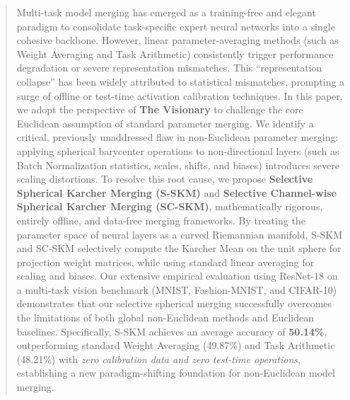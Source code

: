 \documentclass{article}
\begin{document}

\printAffiliationsAndNotice{}

\begin{abstract}
Multi-task model merging has emerged as a training-free and elegant paradigm to consolidate task-specific expert neural networks into a single cohesive backbone. However, linear parameter-averaging methods (such as Weight Averaging and Task Arithmetic) consistently trigger performance degradation or severe representation mismatches. This ``representation collapse'' has been widely attributed to statistical mismatches, prompting a surge of offline or test-time activation calibration techniques. In this paper, we adopt the perspective of \textbf{The Visionary} to challenge the core Euclidean assumption of standard parameter merging. We identify a critical, previously unaddressed flaw in non-Euclidean parameter merging: applying spherical barycenter operations to non-directional layers (such as Batch Normalization statistics, scales, shifts, and biases) introduces severe scaling distortions. To resolve this root cause, we propose \textbf{Selective Spherical Karcher Merging (S-SKM)} and \textbf{Selective Channel-wise Spherical Karcher Merging (SC-SKM)}, mathematically rigorous, entirely offline, and data-free merging frameworks. By treating the parameter space of neural layers as a curved Riemannian manifold, S-SKM and SC-SKM selectively compute the Karcher Mean on the unit sphere for projection weight matrices, while using standard linear averaging for scaling and biases. Our extensive empirical evaluation using ResNet-18 on a multi-task vision benchmark (MNIST, Fashion-MNIST, and CIFAR-10) demonstrates that our selective spherical merging successfully overcomes the limitations of both global non-Euclidean methods and Euclidean baselines. Specifically, S-SKM achieves an average accuracy of \textbf{50.14\%}, outperforming standard Weight Averaging (49.87\%) and Task Arithmetic (48.21\%) with \emph{zero calibration data and zero test-time operations}, establishing a new paradigm-shifting foundation for non-Euclidean model merging.
\end{abstract}
\end{document}
